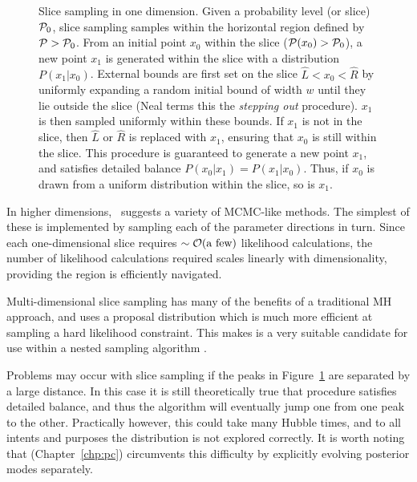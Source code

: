 \begin{figure}[tp]
  \caption{Slice sampling in one dimension. 
    Given a probability level (or slice) \(\mathcal{P}_0\), slice sampling samples within the horizontal region defined by \(\mathcal{P}>\mathcal{P}_0\). 
    From an initial point \(x_0\) within the slice (\(\mathcal{P}(x_0)>\mathcal{P}_0\)), a new point \(x_1\) is generated within the slice with a distribution \(P(x_1|x_0)\).
    External bounds are first set on the slice \(\hat{L}<x_0<\hat{R}\) by uniformly expanding a random initial bound of width \(w\) until they lie outside the slice (Neal terms this the {\em stepping out\/} procedure). 
    \(x_1\) is then sampled uniformly within these bounds.  
    If \(x_1\) is not in the slice, then \(\hat{L}\) or \(\hat{R}\) is replaced with \(x_1\), ensuring that \(x_0\) is still within the slice.
    This procedure is guaranteed to generate a new point \(x_1\), and satisfies detailed balance \(P(x_0|x_1) = P(x_1|x_0)\). Thus, if \(x_0\) is drawn from a uniform distribution within the slice, so is \(x_1\).\label{fig:bay:1d_slice}
  }
\end{figure}

In higher dimensions,~\cite{NealSlice} suggests a variety of MCMC-like methods. The simplest of these is implemented by sampling each of the parameter directions in turn. Since each one-dimensional slice requires \({\sim\mathcal{O}{\left(\text{a few}\right)}}\) likelihood calculations, the number of likelihood calculations required scales linearly with dimensionality, providing the region is efficiently navigated. 

Multi-dimensional slice sampling has many of the benefits of a traditional MH approach, and uses a proposal distribution which is much more efficient at sampling a hard likelihood constraint. This makes is a very suitable candidate for use within a nested sampling algorithm \citep{skilling2006}. 

Problems may occur with slice sampling if the peaks in Figure~\ref{fig:bay:1d_slice} are separated by a large distance. In this case it is still theoretically true that procedure satisfies detailed balance, and thus the algorithm will eventually jump one from one peak to the other. Practically however, this could take many Hubble times, and to all intents and purposes the distribution is not explored correctly. It is worth noting that \PolyChord{} (Chapter~\ref{chp:pc}) circumvents this difficulty by explicitly evolving posterior modes separately.



